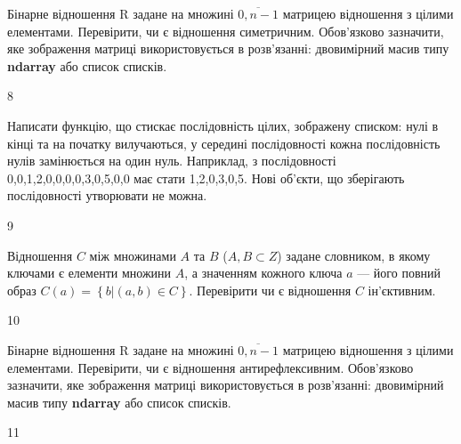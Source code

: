 Бінарне відношення R задане на множині $\overline{0,n-1}$ матрицею відношення з цілими елементами.  Перевірити, чи є відношення симетричним. Обов'язково зазначити, яке зображення матриці використовується в розв'язанні: двовимірний масив типу \textbf{ndarray} або список списків.
\\\par
8 














Написати функцію, що стискає послідовність цілих, зображену списком: нулі в кінці та на початку вилучаються, у середині послідовності кожна послідовність нулів замінюється на один нуль. Наприклад, з послідовності 0,0,1,2,0,0,0,0,3,0,5,0,0 має стати 1,2,0,3,0,5. Нові об'єкти, що зберігають послідовності утворювати не можна.
\\\par


9 














Відношення $C$ між множинами $A$ та $B$ ($A, B\subset Z$) задане словником, в якому ключами є елементи множини $A$, а значенням кожного ключа $a$ --- його повний образ $C\left(a\right)=\left\{b|\left(a,b\right)\in C\right\}$. Перевірити чи є відношення $C$ ін'єктивним.
\\\par
10 














Бінарне відношення R задане на множині $\overline{0,n-1}$ матрицею відношення з цілими елементами.  Перевірити, чи є відношення антирефлексивним. Обов'язково зазначити, яке зображення матриці використовується в розв'язанні: двовимірний масив типу \textbf{ndarray} або список списків.
\\\par


11 














